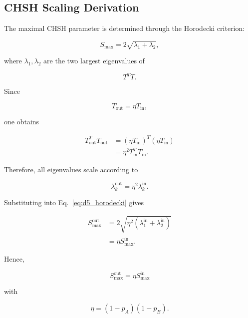 \subsection{CHSH Scaling Derivation}

The maximal CHSH parameter is determined through the Horodecki criterion:

\begin{equation}
S_{\max}
=
2\sqrt{\lambda_1+\lambda_2},
\label{eq:d5_horodecki}
\end{equation}

where \( \lambda_1,\lambda_2 \) are the two largest eigenvalues of

\begin{equation}
T^TT.
\end{equation}

\medskip

Since

\begin{equation}
T_{\mathrm{out}}
=
\eta T_{\mathrm{in}},
\end{equation}

one obtains

\begin{align}
T_{\mathrm{out}}^T
T_{\mathrm{out}}
&=
(\eta T_{\mathrm{in}})^T
(\eta T_{\mathrm{in}})
\nonumber
\\
&=
\eta^2
T_{\mathrm{in}}^T
T_{\mathrm{in}}.
\end{align}

Therefore, all eigenvalues scale according to

\begin{equation}
\lambda_k^{\mathrm{out}}
=
\eta^2
\lambda_k^{\mathrm{in}}.
\end{equation}

Substituting into Eq.~\eqref{eq:d5_horodecki} gives

\begin{align}
S_{\max}^{\mathrm{out}}
&=
2\sqrt{
\eta^2
(\lambda_1^{\mathrm{in}}+\lambda_2^{\mathrm{in}})
}
\nonumber
\\
&=
\eta
S_{\max}^{\mathrm{in}}.
\end{align}

Hence,

\begin{equation}
\boxed{
S_{\max}^{\mathrm{out}}
=
\eta
S_{\max}^{\mathrm{in}}
}
\label{eq:d5_final_chsh_scaling}
\end{equation}

with

\[
\eta=(1-p_A)(1-p_B).
\]

